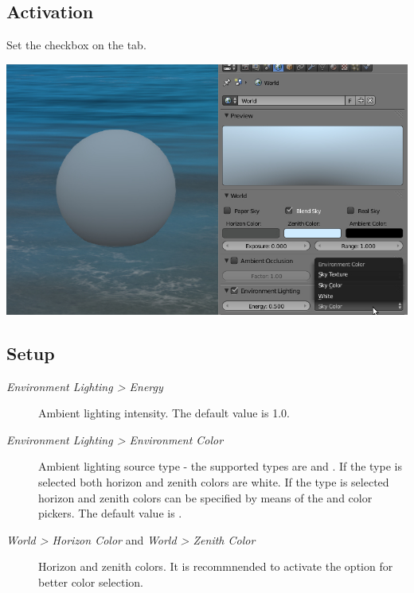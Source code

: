 \documentclass[a4paper,12pt,oneside]{sphinxmanual}
\begin{document}
\subsection{Activation}
\label{lighting:id6}
Set the  checkbox on the  tab.

{\hfill\includegraphics[width=1.000\linewidth]{lighting_environment.jpg}\hfill}


\subsection{Setup}
\label{lighting:id7}\begin{description}
\item[{\emph{Environment Lighting \textgreater{} Energy}}] \leavevmode
Ambient lighting intensity. The default value is 1.0.

\item[{\emph{Environment Lighting \textgreater{} Environment Color}}] \leavevmode
Ambient lighting source type - the supported types are  and . If the  type is selected both horizon and zenith colors are white. If the  type is selected horizon and zenith colors can be specified by means of the  and  color pickers. The default value is .

\item[{\emph{World \textgreater{} Horizon Color} and \emph{World \textgreater{} Zenith Color}}] \leavevmode
Horizon and zenith colors. It is recommnended to activate the  option for better color selection.

\end{description}
\end{document}

